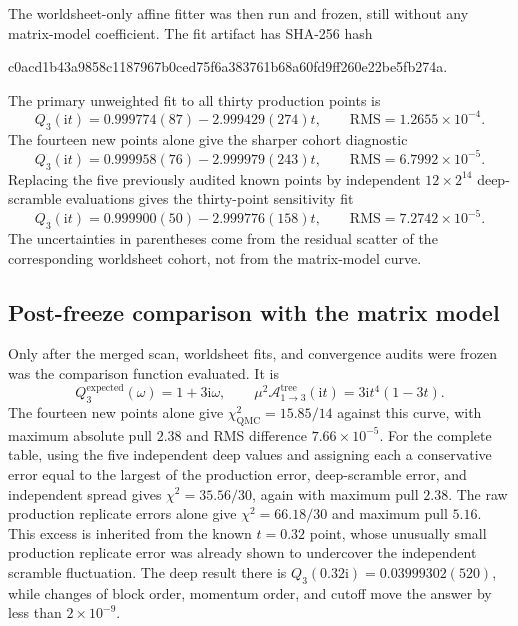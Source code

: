 \documentclass[11pt]{article}
\newcommand{\ii}{\mathrm{i}}
\newcommand{\A}{\mathcal{A}}
\newcommand{\QMC}{\mathrm{QMC}}
\begin{document}
The worldsheet-only affine fitter was then run and frozen, still without any
matrix-model coefficient.  The fit artifact has SHA-256 hash
\begin{center}
\small\ttfamily
c0acd1b43a9858c1187967b0ced75f6a383761b68a60fd9ff260e22be5fb274a.
\end{center}
The primary unweighted fit to all thirty production points is
\begin{equation}
  Q_3(\ii t)=0.999774(87)-2.999429(274)t,
  \qquad \mathrm{RMS}=1.2655\times10^{-4}.
  \label{eq:Q3-blind-fit}
\end{equation}
The fourteen new points alone give the sharper cohort diagnostic
\begin{equation}
  Q_3(\ii t)=0.999958(76)-2.999979(243)t,
  \qquad \mathrm{RMS}=6.7992\times10^{-5}.
  \label{eq:Q3-new-cohort-fit}
\end{equation}
Replacing the five previously audited known points by independent
$12\times2^{14}$ deep-scramble evaluations gives the thirty-point
sensitivity fit
\begin{equation}
  Q_3(\ii t)=0.999900(50)-2.999776(158)t,
  \qquad \mathrm{RMS}=7.2742\times10^{-5}.
  \label{eq:Q3-deep-fit}
\end{equation}
The uncertainties in parentheses come from the residual scatter of the
corresponding worldsheet cohort, not from the matrix-model curve.

\subsection{Post-freeze comparison with the matrix model}

Only after the merged scan, worldsheet fits, and convergence audits were
frozen was the comparison function evaluated.  It is
\begin{equation}
  Q_3^{\mathrm{expected}}(\omega)=1+3\ii\omega,
  \qquad
  \boxed{\mu^2\A^{\mathrm{tree}}_{1\to3}(\ii t)
  =3\ii t^4(1-3t).}
  \label{eq:A13-result}
\end{equation}
The fourteen new points alone give $\chi^2_{\QMC}=15.85/14$ against this
curve, with maximum absolute pull $2.38$ and RMS difference
$7.66\times10^{-5}$.  For the complete table, using the five independent
deep values and assigning each a conservative error equal to the largest of
the production error, deep-scramble error, and independent spread gives
$\chi^2=35.56/30$, again with maximum pull $2.38$.  The raw production
replicate errors alone give $\chi^2=66.18/30$ and maximum pull $5.16$.  This
excess is inherited from the known $t=0.32$ point, whose unusually small
production replicate error was already shown to undercover the independent
scramble fluctuation.  The deep result there is
$Q_3(0.32\ii)=0.03999302(520)$, while changes of block order, momentum order,
and cutoff move the answer by less than $2\times10^{-9}$.
\end{document}
